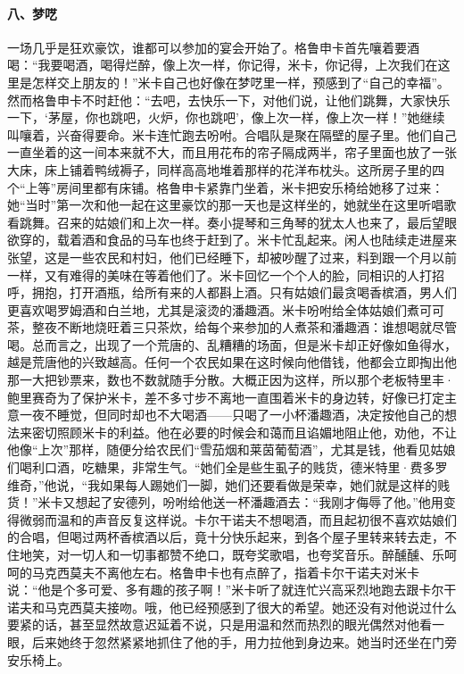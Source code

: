 \paragraph*{八、梦呓}
\par 一场几乎是狂欢豪饮，谁都可以参加的宴会开始了。格鲁申卡首先嚷着要酒喝：“我要喝酒，喝得烂醉，像上次一样，你记得，米卡，你记得，上次我们在这里是怎样交上朋友的！”米卡自己也好像在梦呓里一样，预感到了“自己的幸福”。然而格鲁申卡不时赶他：“去吧，去快乐一下，对他们说，让他们跳舞，大家快乐一下，‘茅屋，你也跳吧，火炉，你也跳吧’，像上次一样，像上次一样！”她继续叫嚷着，兴奋得要命。米卡连忙跑去吩咐。合唱队是聚在隔壁的屋子里。他们自己一直坐着的这一间本来就不大，而且用花布的帘子隔成两半，帘子里面也放了一张大床，床上铺着鸭绒褥子，同样高高地堆着那样的花洋布枕头。这所房子里的四个“上等”房间里都有床铺。格鲁申卡紧靠门坐着，米卡把安乐椅给她移了过来：她“当时”第一次和他一起在这里豪饮的那一天也是这样坐的，她就坐在这里听唱歌看跳舞。召来的姑娘们和上次一样。奏小提琴和三角琴的犹太人也来了，最后望眼欲穿的，载着酒和食品的马车也终于赶到了。米卡忙乱起来。闲人也陆续走进屋来张望，这是一些农民和村妇，他们已经睡下，却被吵醒了过来，料到跟一个月以前一样，又有难得的美味在等着他们了。米卡回忆一个个人的脸，同相识的人打招呼，拥抱，打开酒瓶，给所有来的人都斟上酒。只有姑娘们最贪喝香槟酒，男人们更喜欢喝罗姆酒和白兰地，尤其是滚烫的潘趣酒。米卡吩咐给全体姑娘们煮可可茶，整夜不断地烧旺着三只茶炊，给每个来参加的人煮茶和潘趣酒：谁想喝就尽管喝。总而言之，出现了一个荒唐的、乱糟糟的场面，但是米卡却正好像如鱼得水，越是荒唐他的兴致越高。任何一个农民如果在这时候向他借钱，他都会立即掏出他那一大把钞票来，数也不数就随手分散。大概正因为这样，所以那个老板特里丰·鲍里赛奇为了保护米卡，差不多寸步不离地一直围着米卡的身边转，好像已打定主意一夜不睡觉，但同时却也不大喝酒——只喝了一小杯潘趣酒，决定按他自己的想法来密切照顾米卡的利益。他在必要的时候会和蔼而且谄媚地阻止他，劝他，不让他像“上次”那样，随便分给农民们“雪茄烟和莱茵葡萄酒”，尤其是钱，他看见姑娘们喝利口酒，吃糖果，非常生气。“她们全是些生虱子的贱货，德米特里·费多罗维奇，”他说，“我如果每人踢她们一脚，她们还要看做是荣幸，她们就是这样的贱货！”米卡又想起了安德列，吩咐给他送一杯潘趣酒去：“我刚才侮辱了他。”他用变得微弱而温和的声音反复这样说。卡尔干诺夫不想喝酒，而且起初很不喜欢姑娘们的合唱，但喝过两杯香槟酒以后，竟十分快乐起来，到各个屋子里转来转去走，不住地笑，对一切人和一切事都赞不绝口，既夸奖歌唱，也夸奖音乐。醉醺醺、乐呵呵的马克西莫夫不离他左右。格鲁申卡也有点醉了，指着卡尔干诺夫对米卡说：“他是个多可爱、多有趣的孩子啊！”米卡听了就连忙兴高采烈地跑去跟卡尔干诺夫和马克西莫夫接吻。哦，他已经预感到了很大的希望。她还没有对他说过什么要紧的话，甚至显然故意迟延着不说，只是用温和然而热烈的眼光偶然对他看一眼，后来她终于忽然紧紧地抓住了他的手，用力拉他到身边来。她当时还坐在门旁安乐椅上。
